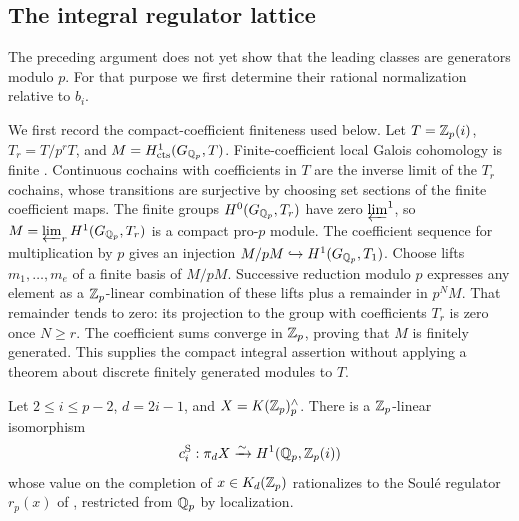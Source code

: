 \subsection{The integral regulator lattice}
\label{gen:regulator-section}

The preceding argument does not yet show that the leading classes are
generators modulo $p$.  For that purpose we first determine their
rational normalization relative to $b_i$.

We first record the compact-coefficient finiteness used below.
Let $T=\mathbb Z_p(i)$, $T_r=T/p^rT$, and
$M=H^1_{\mathrm{cts}}(G_{\mathbb Q_p},T)$.
Finite-coefficient local Galois cohomology is finite
\cite[Chapter~I, Theorem~2.1]{MilneADT}.
Continuous cochains with coefficients in $T$ are the inverse limit
of the $T_r$ cochains, whose transitions are surjective by choosing
set sections of the finite coefficient maps.  The finite groups
$H^0(G_{\mathbb Q_p},T_r)$ have zero $\varprojlim^1$, so
$M=\varprojlim_r H^1(G_{\mathbb Q_p},T_r)$ is a compact pro-$p$ module.
The coefficient sequence for multiplication by $p$ gives an injection
$M/pM\hookrightarrow H^1(G_{\mathbb Q_p},T_1)$.
Choose lifts $m_1,\ldots,m_e$ of a finite basis of $M/pM$.
Successive reduction modulo $p$ expresses any element as a
$\mathbb Z_p$-linear combination of these lifts plus a remainder in $p^NM$.
That remainder tends to zero: its projection to the group with
coefficients $T_r$ is zero once $N\geq r$.
The coefficient sums converge in $\mathbb Z_p$, proving that $M$ is
finitely generated.  This supplies the compact integral assertion
without applying a theorem about discrete finitely generated
modules to $T$.

\begin{lemma}\label{gen:soule-coordinate}
Let $2\leq i\leq p-2$, $d=2i-1$, and $X=K(\mathbb Z_p)^\wedge_p$.
There is a $\mathbb Z_p$-linear isomorphism
\[
 c_i^{\mathrm S}:\pi_dX\xrightarrow{\sim}H^1(\mathbb Q_p,\mathbb Z_p(i))
\]
whose value on the completion of $x\in K_d(\mathbb Z_p)$ rationalizes to
the Soul\'e regulator $r_p(x)$ of \cite[Section~1.3]{HuberKings},
restricted from $\mathbb Q_p$ by localization.
\end{lemma}

